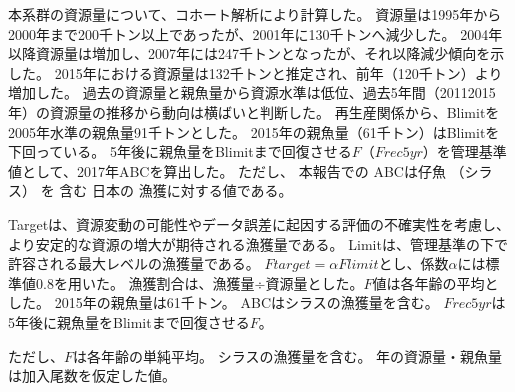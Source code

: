 本系群の資源量について、コホート解析により計算した。
資源量は1995年から2000年まで200千トン以上であったが、2001年に130千トンへ減少した。
2004年以降資源量は増加し、2007年には247千トンとなったが、それ以降減少傾向を示した。
2015年における資源量は132千トンと推定され、前年（120千トン）より増加した。
過去の資源量と親魚量から資源水準は低位、過去5年間（20112015年）の資源量の推移から動向は横ばいと判断した。
再生産関係から、Blimitを2005年水準の親魚量91千トンとした。
2015年の親魚量（61千トン）はBlimitを下回っている。
5年後に親魚量をBlimitまで回復させる$F$（$Frec5yr$）を管理基準値として、2017年ABCを算出した。%
ただし、
本報告での
ABCは仔魚
（シラス）
を
含む
日本の
漁獲に対する値である。%



Targetは、資源変動の可能性やデータ誤差に起因する評価の不確実性を考慮し、
より安定的な資源の増大が期待される漁獲量である。
Limitは、管理基準の下で許容される最大レベルの漁獲量である。
$Ftarget = \alpha Flimit$とし、係数$\alpha$には標準値0.8を用いた。
漁獲割合は、漁獲量÷資源量とした。$F$値は各年齢の平均とした。
2015年の親魚量は61千トン。
ABCはシラスの漁獲量を含む。
$Frec5yr$は5年後に親魚量をBlimitまで回復させる$F$。


ただし、$F$は各年齢の単純平均。
シラスの漁獲量を含む。
\thisyrad 年の資源量・親魚量は加入尾数を仮定した値。%
